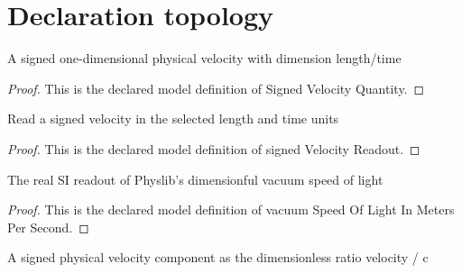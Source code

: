 \section{Declaration topology}
\begin{definition}
  \label{def:physics:phyx-mini-0595:phyxminiproblems-problemphyxmini0595-signedvelocityquantity}
  A signed one-dimensional physical velocity with dimension length/time
\end{definition}
\begin{proof}
  This is the declared model definition of Signed Velocity Quantity.
\end{proof}
\begin{definition}
  \label{def:physics:phyx-mini-0595:phyxminiproblems-problemphyxmini0595-signedvelocityreadout}
  Read a signed velocity in the selected length and time units
\end{definition}
\begin{proof}
  This is the declared model definition of signed Velocity Readout.
\end{proof}
\begin{definition}
  \label{def:physics:phyx-mini-0595:phyxminiproblems-problemphyxmini0595-vacuumspeedoflightinmeterspersecond}
  The real SI readout of Physlib's dimensionful vacuum speed of light
\end{definition}
\begin{proof}
  This is the declared model definition of vacuum Speed Of Light In Meters Per Second.
\end{proof}
\begin{definition}
  \label{def:physics:phyx-mini-0595:phyxminiproblems-problemphyxmini0595-velocityinlightspeedunits}
  A signed physical velocity component as the dimensionless ratio velocity / c
\end{definition}
